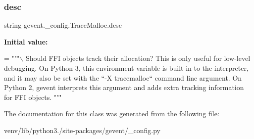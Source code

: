 \subsubsection{\texorpdfstring{desc}{desc}}
{\footnotesize\ttfamily string gevent.\+\_\+config.\+Trace\+Malloc.\+desc\hspace{0.3cm}{\ttfamily [static]}}

{\bfseries Initial value\+:}
\begin{DoxyCode}
=  \textcolor{stringliteral}{"""\(\backslash\)}
\textcolor{stringliteral}{Should FFI objects track their allocation?}
\textcolor{stringliteral}{}
\textcolor{stringliteral}{This is only useful for low-level debugging.}
\textcolor{stringliteral}{}
\textcolor{stringliteral}{On Python 3, this environment variable is built in to the}
\textcolor{stringliteral}{interpreter, and it may also be set with the ``-X}
\textcolor{stringliteral}{tracemalloc`` command line argument.}
\textcolor{stringliteral}{}
\textcolor{stringliteral}{On Python 2, gevent interprets this argument and adds extra}
\textcolor{stringliteral}{tracking information for FFI objects.}
\textcolor{stringliteral}{"""}
\end{DoxyCode}


The documentation for this class was generated from the following file\+:\begin{DoxyCompactItemize}
\item 
venv/lib/python3./site-\/packages/gevent/\+\_\+config.\+py\end{DoxyCompactItemize}
